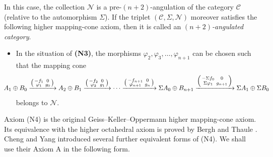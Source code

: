 \documentclass[12pt, twoside]{article}
\def\C{\mathscr{C}}\def\N{\mathscr{N}}
\numberwithin{equation}{section}
\begin{document}
\begin{definition}
In this case, the collection $\N$ is a pre-$(n+2)$-angulation of the category $\C$ (relative to the automorphism $\Sigma$). If the triplet $(\C,\Sigma,\N)$ moreover satisfies the following higher mapping-cone axiom, then it is called
an \emph{$(n+2)$-angulated category}.
\begin{itemize}
\item[\textbf{(N4)}]
In the situation of \textbf{(N3)}, the morphisms
$\varphi_2,\varphi_3,\ldots,\varphi_{n+1}$ can be chosen such that
the mapping cone
$$\hspace{-7mm}
A_1\oplus B_0
\xrightarrow{
\left(
\begin{smallmatrix}
-f_1&0\\
\varphi_1&g_0
\end{smallmatrix}
\right)}
A_2\oplus B_1
\xrightarrow{
\left(
\begin{smallmatrix}
-f_2&0\\
\varphi_2&g_1
\end{smallmatrix}
\right)}
\cdots
\xrightarrow{
\left(
\begin{smallmatrix}
-f_{n+1}&0\\
\varphi_{n+1}&g_n
\end{smallmatrix}
\right)}
\Sigma A_0\oplus B_{n+1}
\xrightarrow{
\left(
\begin{smallmatrix}
-\Sigma f_0&0\\
\Sigma\varphi_1&g_{n+1}
\end{smallmatrix}
\right)}
\Sigma A_1\oplus\Sigma B_0
$$
belongs to $\N$.

\end{itemize}
\end{definition}
\begin{remark}
Axiom (N4) is the original Geiss--Keller--Oppermann  higher mapping-cone axiom. Its equivalence with the higher octahedral axiom is proved by Bergh and Thaule \cite{bt2}. Cheng and Yang \cite{CY} introduced several further equivalent forms of (N4). We shall use their Axiom A in the following form.
\end{remark}
\end{document}
